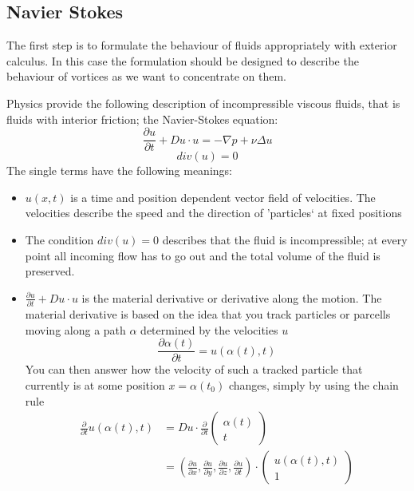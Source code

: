 \subsection{Navier Stokes}
The first step is to formulate the behaviour of fluids appropriately with exterior calculus. In this case the formulation should be designed to describe the behaviour of vortices as we want to concentrate on them.

Physics provide the following description of incompressible viscous fluids, that is fluids with interior friction; the Navier-Stokes equation:
\[\frac{\partial u}{\partial t} + Du \cdot u = -\nabla p + \nu \Delta u\]
\begin{equation}div(u) = 0\label{eq:NS}\end{equation} 
The single terms have the following meanings:
\begin{itemize}
	\item $u(x,t)$ is a time and position dependent vector field of velocities. The velocities describe the speed and the direction of 'particles` at fixed positions
	\item The condition $div(u) = 0$ describes that the fluid is incompressible; at every point all incoming flow has to go out and the total volume of the fluid is preserved.
	\item $\frac{\partial u}{\partial t} + D u \cdot u$ is the material derivative or derivative along the motion. The material derivative is based on the idea that you track particles or parcells moving along a path $\alpha$ determined by the velocities $u$
	\[\frac{\partial \alpha(t)}{\partial t} = u(\alpha(t), t)\]
	You can then answer how the velocity of such a tracked particle that currently is at some position $x = \alpha(t_0)$ changes, simply by using the chain rule 
	\begin{align*}\frac{\partial}{\partial t} u(\alpha(t),t) &= Du \cdot \frac{\partial}{\partial t}\begin{pmatrix}
	\alpha(t) \\
	t
	\end{pmatrix}\\
	&= (\frac{\partial u}{\partial x}, \frac{\partial u}{\partial y},\frac{\partial u}{\partial z}, \frac{\partial u}{\partial t}) \cdot \begin{pmatrix}
	u(\alpha(t),t) \\
	1
	\end{pmatrix} \\

\end{align*}
\end{itemize}
